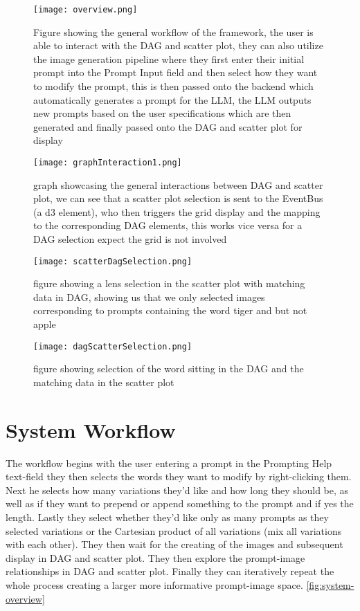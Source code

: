 \documentclass[
  a4paper,  %
  twoside,  %
  bibliography=totoc,
  headsepline,
  cleardoublepage=empty,
  parskip=half,
  draft=false
]{scrbook}
\begin{document}
\begin{figure}[H]        %
	\centering           %
	\texttt{[image: overview.png]}
	\caption{Figure showing the general workflow of the framework, the user is able to interact with the DAG and scatter plot, they can also utilize the image generation pipeline where they first enter their initial prompt into the Prompt Input field and then select how they want to modify the prompt, this is then passed onto the backend which automatically generates a prompt for the LLM, the LLM outputs new prompts based on the user specifications which are then generated and finally passed onto the DAG and scatter plot for display}
	\label{fig:workflow-overview}  %
\end{figure}












\begin{figure}[H]
	\centering
	\texttt{[image: graphInteraction1.png]}
	\caption{graph showcasing the general interactions between DAG and scatter plot, we can see that a scatter plot selection is sent to the EventBus (a d3 element), who then triggers the grid display and the mapping to the corresponding DAG elements, this works vice versa for a DAG selection expect the grid is not involved}
	\label{fig:graphInteraction}
\end{figure}

\begin{figure}[H]
	\centering
	\texttt{[image: scatterDagSelection.png]}
	\caption{figure showing a lens selection in the scatter plot with matching data in DAG, showing us that we only selected images corresponding to prompts containing the word tiger and but not apple}
	\label{fig:scatterDagSelection}
\end{figure}
\begin{figure}[H]
	\centering
	\texttt{[image: dagScatterSelection.png]}
	\caption{figure showing selection of the word sitting in the DAG and the matching data in the scatter plot}
	\label{fig:dagScatterSelection}
\end{figure}
\section{System Workflow}
The workflow begins with the user entering a prompt in the Prompting Help text-field they then selects the words they want to modify by right-clicking them. Next he selects how many variations they'd like and how long they should be, as well as if they want to prepend or append something to the prompt and if yes the length. Lastly they select whether they'd like only as many prompts as they selected variations or the Cartesian product of all variations (mix all variations with each other). They then wait for the creating of the images and subsequent display in DAG and scatter plot. They then explore the prompt-image relationships in DAG and scatter plot. Finally they can iteratively repeat the whole process creating a larger more informative prompt-image space. \cref{fig:system-overview}
\end{document}
